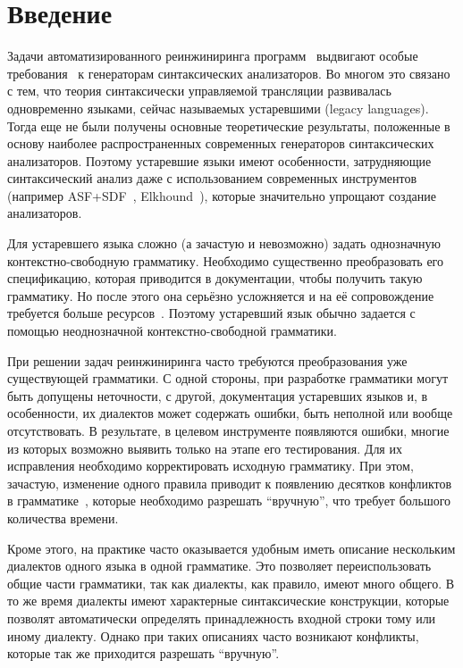 \section{Введение}	

Задачи автоматизированного  реинжиниринга  программ~\cite{Reeng} выдвигают особые требования~\cite{CurrentParsTechn} к генераторам синтаксических анализаторов. Во многом это связано с тем, что теория синтаксически управляемой трансляции развивалась одновременно языками, сейчас называемых устаревшими (legacy languages). Тогда еще не были получены основные теоретические результаты, положенные в основу наиболее распространенных современных генераторов синтаксических анализаторов. Поэтому устаревшие языки имеют особенности, затрудняющие синтаксический анализ даже с использованием современных инструментов (например ASF+SDF~\cite{ASF+SDF}, Elkhound~\cite{Elkhound}), которые значительно упрощают создание анализаторов.

Для устаревшего языка сложно (а зачастую и невозможно) задать однозначную контекстно-свободную грамматику. Необходимо существенно преобразовать его спецификацию, которая приводится в документации, чтобы получить такую грамматику. Но после этого она серьёзно усложняется и на её сопровождение требуется больше ресурсов~\cite{CurrentParsTechn}. Поэтому устаревший язык обычно задается с помощью неоднозначной контекстно-свободной грамматики.

При решении задач реинжиниринга часто требуются преобразования уже существующей грамматики. С одной стороны, при разработке  грамматики могут быть допущены неточности, с другой, документация устаревших языков и, в особенности, их диалектов может содержать ошибки, быть неполной или вообще отсутствовать. В результате, в целевом инструменте появляются ошибки, многие из которых возможно выявить только на этапе его тестирования. Для их исправления необходимо корректировать исходную грамматику. При этом, зачастую, изменение одного правила приводит к появлению десятков конфликтов в грамматике~\cite{CurrentParsTechn}, которые необходимо разрешать "`вручную"', что требует большого количества времени.

Кроме этого, на практике часто оказывается удобным иметь описание нескольким диалектов одного языка в одной грамматике. Это позволяет переиспользовать общие части грамматики, так как диалекты, как правило, имеют много общего. В то же время диалекты имеют характерные синтаксические конструкции, которые позволят автоматически определять принадлежность входной строки тому или иному диалекту. Однако при таких описаниях часто возникают конфликты, которые так же приходится разрешать "`вручную"'.

